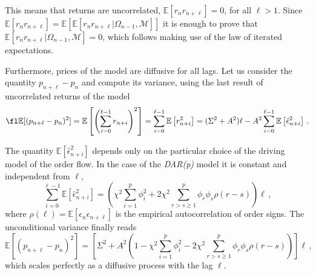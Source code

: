 \documentclass[12pt]{iopart}
\begin{document}
This means that returns are uncorrelated, $\mathbb{E}[r_n r_{n+\ell}]=0$, for all $\ell>1$. Since $\mathbb{E}[r_n r_{n+\ell}]=\mathbb{E}[\mathbb{E}[r_n r_{n+\ell}|\Omega_{n-1},\mathcal{M}]]$ it is enough to prove that
$\mathbb{E}[r_n r_{n+\ell}|\Omega_{n-1},\mathcal{M}]=0$, which follows making use of the law of iterated expectations.

Furthermore, prices of the model are diffusive for all lags. Let us consider the quantity $p_{n+\ell}-p_n$ and compute its variance, using the last result of uncorrelated returns of the model
\begin{equation*}
\fl \mathbb{E}[(p_{n+\ell}-p_n)^2]=\mathbb{E}\left[\left(\sum_{i=0}^{\ell-1} r_{n+i}\right)^2\right]=\sum_{i=0}^{\ell-1} \mathbb{E}\left[r_{n+i}^2\right] = (\Sigma^2 + A^2)\ell-A^2\sum_{i=0}^{\ell-1} \mathbb{E}\left[\hat{\epsilon}_{n+i}^2\right]\,.
\end{equation*}

The quantity $\mathbb{E}\left[\hat{\epsilon}_{n+i}^2\right]$ depends only on the particular choice of the driving model of the order flow. In the case of the \textit{DAR(p)} model it is constant and independent from $\ell$,
\begin{equation*}
\sum_{i=0}^{\ell-1} \mathbb{E}\left[\hat{\epsilon}_{n+i}^2\right]= \left(\chi^2\sum_{i=1}^p\phi_i^2+2\chi^2\sum_{r>s\geqslant 1}^p\phi_r \phi_s \rho(r-s)\right)\ell\,,
\end{equation*}
where $\rho(\ell)=\mathbb{E}[\epsilon_n\epsilon_{n+\ell}]$ is the empirical autocorrelation of order signs. The unconditional variance finally reads
\begin{equation*}
\mathbb{E}[(p_{n+\ell}-p_n)^2]=\left[\Sigma^2 + A^2\left(1-\chi^2\sum_{i=1}^p\phi_i^2-2\chi^2\sum_{r>s\geqslant 1}^p\phi_r \phi_s \rho(r-s)\right)\right]\ell\,,
\end{equation*}
which scales perfectly as a diffusive process with the lag $\ell$.
\end{document}
